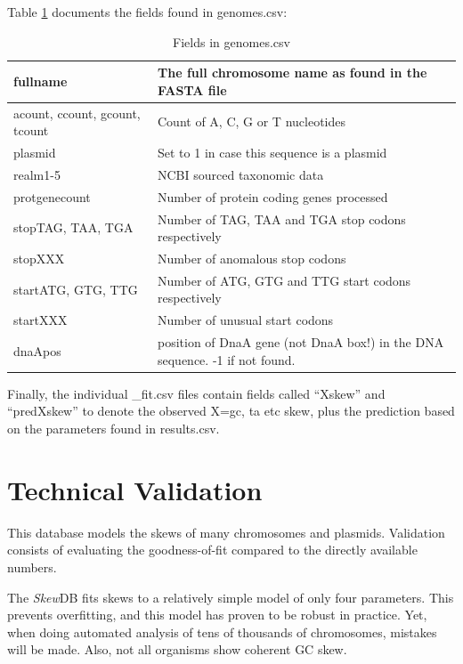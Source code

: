 \documentclass[fleqn,10pt]{wlscirep}
\begin{document}
Table \ref{tab:genomes-table} documents the fields found in genomes.csv:

\begin{table}[H]
\begin{tabular}{|l|l|}
  \hline
fullname                 & The full chromosome name as found in the FASTA file                \\ \hline
acount, ccount, gcount, tcount                 & Count of A, C, G or T nucleotides                \\ \hline
plasmid & Set to 1 in case this sequence is a plasmid \\ \hline
realm1-5     & NCBI sourced taxonomic data \\ \hline
protgenecount                           & Number of protein coding genes processed          \\ \hline
stopTAG, TAA, TGA & Number of TAG, TAA and TGA stop codons respectively          \\ \hline
stopXXX & Number of anomalous stop codons  \\ \hline
startATG, GTG, TTG & Number of ATG, GTG and TTG start codons respectively          \\ \hline
startXXX & Number of unusual start codons  \\ \hline
dnaApos & position of DnaA gene (not DnaA box!) in the DNA sequence. -1 if not found.  \\ \hline
\end{tabular}
\caption{Fields in genomes.csv}
\label{tab:genomes-table}
\end{table}


Finally, the individual \_fit.csv files contain fields called ``Xskew'' and ``predXskew'' to denote the observed X=gc, ta etc skew, plus the prediction based on the parameters found in results.csv. 
\section*{Technical Validation}
This database models the skews of many chromosomes and plasmids. Validation consists of evaluating the goodness-of-fit compared to the directly available numbers.

The \emph{Skew}DB fits skews to a relatively simple model of only four parameters. This prevents overfitting, and this model has proven to be robust in practice. Yet, when doing automated analysis of tens of thousands of chromosomes, mistakes will be made. Also, not all organisms show coherent GC skew.
\end{document}
